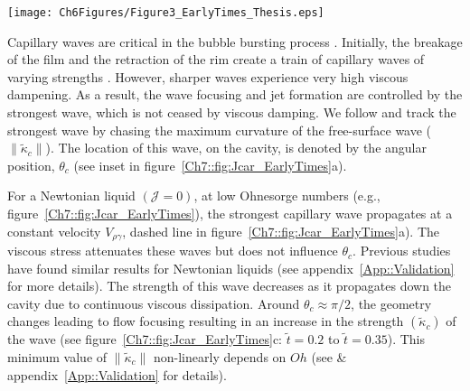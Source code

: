\begin{sidewaysfigure}
	\centering
	\texttt{[image: Ch6Figures/Figure3\_EarlyTimes\_Thesis.eps]}
	\caption{Effects of viscoplasticity on the traveling capillary waves: (a) Variation of the location $\left(\theta_c\right)$ of strongest capillary with time. The gray dotted line denotes the Newtonian limit, $\theta_c -\theta_i \sim -\tilde t$ as described by \citep{gordillo2019capillary}. (b) Variation of the strength $\left(\|\tilde \kappa_c\|\right)$ of the strongest capillary wave with time. Snapshots of the deformation tensor modulus $\|\boldsymbol{\tilde{\mathcal{D}}}\|$ for $\mathcal{J} =$ (c) $0.2$, and (d) $1.0$. Here, time is normalized with the inertio-capilary time scale, $\tau_{\rho\gamma} = \sqrt{\rho_d R_0^3/\gamma}$. For all the cases in this figure, $Oh = 10^{-2}$. Also see supplemental movies {\color{Myfig} 5 -- 7}.}
	\label{Ch7::fig:Jcar_EarlyTimes}
\end{sidewaysfigure}

Capillary waves are critical in the bubble bursting process \citep{gordillo2019capillary}. Initially, the breakage of the film and the retraction of the rim create a train of capillary waves of varying strengths \citep{gekle2009high}. However, sharper waves experience very high viscous dampening. As a result, the wave focusing and jet formation are controlled by the strongest wave, which is not ceased by viscous damping. We follow \citet{gordillo2019capillary} and track the strongest wave by chasing the maximum curvature of the free-surface wave ($\|\tilde \kappa_c\|$). The location of this wave, on the cavity, is denoted by the angular position, $\theta_c$ (see inset in figure~\ref{Ch7::fig:Jcar_EarlyTimes}a). 

For a Newtonian liquid $\left(\mathcal{J} = 0\right)$, at low Ohnesorge numbers (e.g., figure~\ref{Ch7::fig:Jcar_EarlyTimes}), the strongest capillary wave propagates at a constant velocity $V_{\rho\gamma}$, dashed line in figure~\ref{Ch7::fig:Jcar_EarlyTimes}a). The viscous stress attenuates these waves but does not influence $\theta_c$. Previous studies \citep{krishnan2017scaling, gordillo2019capillary} have found similar results for Newtonian liquids (see appendix~\ref{App::Validation} for more details). The strength of this wave decreases as it propagates down the cavity due to continuous viscous dissipation. Around $\theta_c \approx \pi/2$, the geometry changes leading to flow focusing resulting in an increase in the strength $\left(\tilde \kappa_c\right)$ of the wave (see figure~\ref{Ch7::fig:Jcar_EarlyTimes}c: $\tilde t = 0.2$ to $\tilde t = 0.35$). This minimum value of $\|\tilde \kappa_c\|$ non-linearly depends on $Oh$ (see \citet{gordillo2019capillary} \& appendix~\ref{App::Validation} for details).


